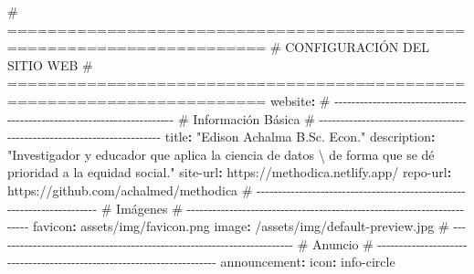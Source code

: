 \documentclass[
  doc,
  floatsintext,
  longtable,
  a4paper,
  nolmodern,
  notxfonts,
  notimes,
  12pt,
  colorlinks=true,linkcolor=blue,citecolor=blue,urlcolor=blue]{apa7}
\newenvironment{Shaded}{\begin{snugshade}}{\end{snugshade}}
\newcommand{\AttributeTok}[1]{\textcolor[rgb]{0.40,0.45,0.13}{#1}}
\newcommand{\CommentTok}[1]{\textcolor[rgb]{0.37,0.37,0.37}{#1}}
\newcommand{\FunctionTok}[1]{\textcolor[rgb]{0.28,0.35,0.67}{#1}}
\newcommand{\KeywordTok}[1]{\textcolor[rgb]{0.00,0.23,0.31}{\textbf{#1}}}
\newcommand{\SpecialCharTok}[1]{\textcolor[rgb]{0.37,0.37,0.37}{#1}}
\newcommand{\StringTok}[1]{\textcolor[rgb]{0.13,0.47,0.30}{#1}}
\begin{document}
\begin{Shaded}
\begin{Highlighting}[]
\CommentTok{\# ========================================================================}
\CommentTok{\# CONFIGURACIÓN DEL SITIO WEB}
\CommentTok{\# ========================================================================}
\FunctionTok{website}\KeywordTok{:}
\CommentTok{  \# {-}{-}{-}{-}{-}{-}{-}{-}{-}{-}{-}{-}{-}{-}{-}{-}{-}{-}{-}{-}{-}{-}{-}{-}{-}{-}{-}{-}{-}{-}{-}{-}{-}{-}{-}{-}{-}{-}{-}{-}{-}{-}{-}{-}{-}{-}{-}{-}{-}{-}{-}{-}{-}{-}{-}{-}{-}{-}{-}{-}{-}{-}{-}{-}{-}{-}{-}{-}{-}{-}}
\CommentTok{  \# Información Básica}
\CommentTok{  \# {-}{-}{-}{-}{-}{-}{-}{-}{-}{-}{-}{-}{-}{-}{-}{-}{-}{-}{-}{-}{-}{-}{-}{-}{-}{-}{-}{-}{-}{-}{-}{-}{-}{-}{-}{-}{-}{-}{-}{-}{-}{-}{-}{-}{-}{-}{-}{-}{-}{-}{-}{-}{-}{-}{-}{-}{-}{-}{-}{-}{-}{-}{-}{-}{-}{-}{-}{-}{-}{-}}
\AttributeTok{  }\FunctionTok{title}\KeywordTok{:}\AttributeTok{ }\StringTok{"Edison Achalma B.Sc. Econ."}
\AttributeTok{  }\FunctionTok{description}\KeywordTok{:}\AttributeTok{ }\StringTok{"Investigador y educador que aplica la ciencia de datos }\SpecialCharTok{\textbackslash{} }
\StringTok{  de forma que se dé prioridad a la equidad social."}
\AttributeTok{  }\FunctionTok{site{-}url}\KeywordTok{:}\AttributeTok{ https://methodica.netlify.app/}
\AttributeTok{  }\FunctionTok{repo{-}url}\KeywordTok{:}\AttributeTok{ https://github.com/achalmed/methodica}
\AttributeTok{  }
\CommentTok{  \# {-}{-}{-}{-}{-}{-}{-}{-}{-}{-}{-}{-}{-}{-}{-}{-}{-}{-}{-}{-}{-}{-}{-}{-}{-}{-}{-}{-}{-}{-}{-}{-}{-}{-}{-}{-}{-}{-}{-}{-}{-}{-}{-}{-}{-}{-}{-}{-}{-}{-}{-}{-}{-}{-}{-}{-}{-}{-}{-}{-}{-}{-}{-}{-}{-}{-}{-}{-}{-}{-}}
\CommentTok{  \# Imágenes}
\CommentTok{  \# {-}{-}{-}{-}{-}{-}{-}{-}{-}{-}{-}{-}{-}{-}{-}{-}{-}{-}{-}{-}{-}{-}{-}{-}{-}{-}{-}{-}{-}{-}{-}{-}{-}{-}{-}{-}{-}{-}{-}{-}{-}{-}{-}{-}{-}{-}{-}{-}{-}{-}{-}{-}{-}{-}{-}{-}{-}{-}{-}{-}{-}{-}{-}{-}{-}{-}{-}{-}{-}{-}}
\AttributeTok{  }\FunctionTok{favicon}\KeywordTok{:}\AttributeTok{ assets/img/favicon.png}
\AttributeTok{  }\FunctionTok{image}\KeywordTok{:}\AttributeTok{ /assets/img/default{-}preview.jpg}
\AttributeTok{  }
\CommentTok{  \# {-}{-}{-}{-}{-}{-}{-}{-}{-}{-}{-}{-}{-}{-}{-}{-}{-}{-}{-}{-}{-}{-}{-}{-}{-}{-}{-}{-}{-}{-}{-}{-}{-}{-}{-}{-}{-}{-}{-}{-}{-}{-}{-}{-}{-}{-}{-}{-}{-}{-}{-}{-}{-}{-}{-}{-}{-}{-}{-}{-}{-}{-}{-}{-}{-}{-}{-}{-}{-}{-}}
\CommentTok{  \# Anuncio}
\CommentTok{  \# {-}{-}{-}{-}{-}{-}{-}{-}{-}{-}{-}{-}{-}{-}{-}{-}{-}{-}{-}{-}{-}{-}{-}{-}{-}{-}{-}{-}{-}{-}{-}{-}{-}{-}{-}{-}{-}{-}{-}{-}{-}{-}{-}{-}{-}{-}{-}{-}{-}{-}{-}{-}{-}{-}{-}{-}{-}{-}{-}{-}{-}{-}{-}{-}{-}{-}{-}{-}{-}{-}}
\AttributeTok{  }\FunctionTok{announcement}\KeywordTok{:}
\AttributeTok{    }\FunctionTok{icon}\KeywordTok{:}\AttributeTok{ info{-}circle}

\end{Highlighting}
\end{Shaded}
\end{document}
